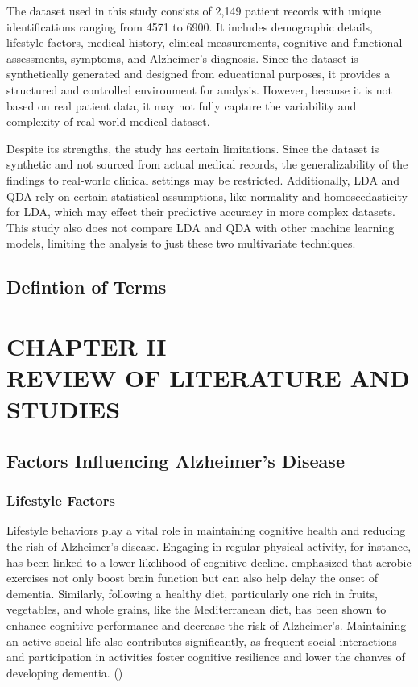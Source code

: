\documentclass[12pt]{article}
\begin{document}
The dataset used in this study consists of 2,149 patient records with unique identifications ranging from 4571 to 6900. It includes demographic details, lifestyle factors, medical history, clinical measurements, cognitive and functional
assessments, symptoms, and Alzheimer's diagnosis. Since the dataset is synthetically generated and designed from educational purposes, it provides a structured and controlled environment for analysis. However, because it is not based on real patient data, 
it may not fully capture the variability and complexity of real-world medical dataset. 

Despite its strengths, the study has certain limitations. Since the dataset is synthetic and not sourced from actual medical records, the generalizability of the findings to real-worlc clinical settings may be restricted. Additionally, LDA and QDA rely on certain
statistical assumptions, like normality and homoscedasticity for LDA, which may effect their predictive accuracy in more complex datasets. This study also does not compare LDA and QDA with other machine learning models, limiting the analysis to just these two multivariate
techniques. 

\subsection{Defintion of Terms}

\newpage
\section{CHAPTER II \\ REVIEW OF LITERATURE AND STUDIES}

\subsection{Factors Influencing Alzheimer's Disease}
\subsubsection {Lifestyle Factors}
\noindent

Lifestyle behaviors play a vital role in maintaining cognitive health and reducing the rish of Alzheimer's disease. Engaging in regular physical activity, for instance, has been linked to a lower likelihood of cognitive decline. \cite{Dominguez2021} emphasized that aerobic
exercises not only boost brain function but can also help delay the onset of dementia. Similarly, following a healthy diet, particularly one rich in fruits, vegetables, and whole grains, like the Mediterranean diet, has been shown to enhance cognitive performance and decrease
the risk of Alzheimer's. Maintaining an active social life also contributes significantly, as frequent social interactions and participation in activities foster cognitive resilience and lower the chanves of developing dementia. (\cite{Dominguez2021})
\end{document}
